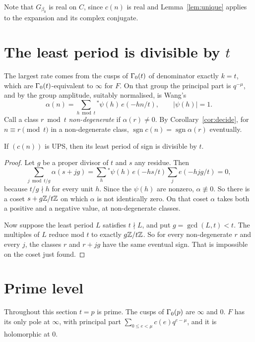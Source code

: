 \documentclass[11pt]{amsart}
\theoremstyle{definition}\newtheorem{definition}[theorem]{Definition}
\theoremstyle{remark}\newtheorem{remark}[theorem]{Remark}
\newcommand{\sgn}{\operatorname{sgn}}\newcommand{\lcm}{\operatorname{lcm}}
\begin{document}
Note that $G_{\beta_0}$ is real on $C$, since $c(n)$ is real and Lemma~\ref{lem:unique} applies to the expansion and its complex conjugate.

\section{The least period is divisible by $t$}\label{sec:period}
The largest rate comes from the cusps of $\Gamma_0(t)$ of denominator exactly $k=t$, which are $\Gamma_0(t)$-equivalent to $\infty$ for $F$. On that group the principal part is $q^{-\mu}$, and by \cite[(2.17)]{W} the group amplitude, suitably normalised, is Wang's
\[
\alpha(n)=\sum_{h\bmod t}{}^{*}\psi(h)\,e(-hn/t),\qquad |\psi(h)|=1 .
\]
Call a class $r\bmod t$ \emph{non-degenerate} if $\alpha(r)\ne0$. By Corollary~\ref{cor:decide}, for $n\equiv r\pmod t$ in a non-degenerate class, $\sgn c(n)=\sgn\alpha(r)$ eventually.

\begin{proposition}\label{prop:period}
If $(c(n))$ is UPS, then its least period of sign is divisible by $t$.
\end{proposition}
\begin{proof}
Let $g$ be a proper divisor of $t$ and $s$ any residue. Then
\[
\sum_{j\bmod t/g}\alpha(s+jg)=\sum_h{}^*\psi(h)\,e(-hs/t)\sum_{j}e(-hj g/t)=0,
\]
because $t/g\nmid h$ for every unit $h$. Since the $\psi(h)$ are nonzero, $\alpha\not\equiv0$. So there is a coset $s+g\mathbb Z/t\mathbb Z$ on which $\alpha$ is not identically zero. On that coset $\alpha$ takes both a positive and a negative value, at non-degenerate classes.

Now suppose the least period $L$ satisfies $t\nmid L$, and put $g=\gcd(L,t)<t$. The multiples of $L$ reduce mod $t$ to exactly $g\mathbb Z/t\mathbb Z$. So for every non-degenerate $r$ and every $j$, the classes $r$ and $r+jg$ have the same eventual sign. That is impossible on the coset just found.
\end{proof}

\section{Prime level}\label{sec:prime}
Throughout this section $t=p$ is prime. The cusps of $\Gamma_0(p)$ are $\infty$ and $0$. $F$ has its only pole at $\infty$, with principal part $\sum_{0\le e<\mu}c(e)q^{e-\mu}$, and it is holomorphic at $0$.
\end{document}
